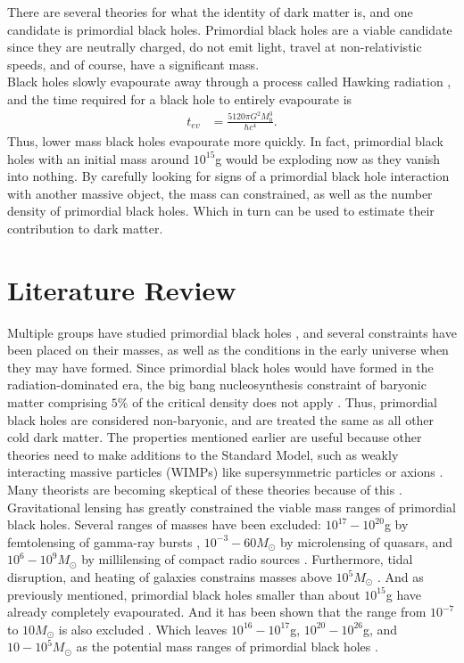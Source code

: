 There are several theories for what the identity of dark matter is, and one candidate is primordial black holes. Primordial black holes are a viable candidate since they are neutrally charged, do not emit light, travel at non-relativistic speeds, and of course, have a significant mass. \\

Black holes slowly evapourate away through a process called Hawking radiation \cite{hawking}, and the time required for a black hole to entirely evapourate is 
\begin{align*}
t_{ev} &= \frac{5120 \pi G^2 M_0^3}{\hbar c^4}.
\end{align*}
Thus, lower mass black holes evapourate more quickly. In fact, primordial black holes with an initial mass around $10^{15}$g would be exploding now as they vanish into nothing. By carefully looking for signs of a primordial black hole interaction with another massive object, the mass can constrained, as well as the number density of primordial black holes. Which in turn can be used to estimate their contribution to dark matter.

\section{Literature Review}

Multiple groups have studied primordial black holes \cite{bigpaper}, and several constraints have been placed on their masses, as well as the conditions in the early universe when they may have formed. Since primordial black holes would have formed in the radiation-dominated era, the big bang nucleosynthesis constraint of baryonic matter comprising $5\%$ of the critical density does not apply \cite{critdens}. Thus, primordial black holes are considered non-baryonic, and are treated the same as all other cold dark matter. The properties mentioned earlier are useful because other theories need to make additions to the Standard Model, such as weakly interacting massive particles (WIMPs) like supersymmetric particles or axions \cite{supersym}. Many theorists are becoming skeptical of these theories because of this \cite{pessimism}. \\

Gravitational lensing has greatly constrained the viable mass ranges of primordial black holes. Several ranges of masses have been excluded: $10^{17}-10^{20}$g by femtolensing of gamma-ray bursts \cite{massfemt}, $10^{-3}-60 M_\odot$ by microlensing of quasars, and $10^6-10^9 M_\odot$ by millilensing of compact radio sources \cite{massmilli}. Furthermore, tidal disruption, and heating of galaxies constrains masses above $10^5 M_\odot$ \cite{massheavy}. And as previously mentioned, primordial black holes smaller than about $10^{15}$g have already completely evapourated. And it has been shown that the range from $10^{-7}$ to $10 M_\odot$ is also excluded \cite{mass1}. Which leaves $10^{16}-10^{17}$g, $10^{20}-10^{26}$g, and $10-10^{5}M_\odot$ as the potential mass ranges of primordial black holes \cite{massrange}.

